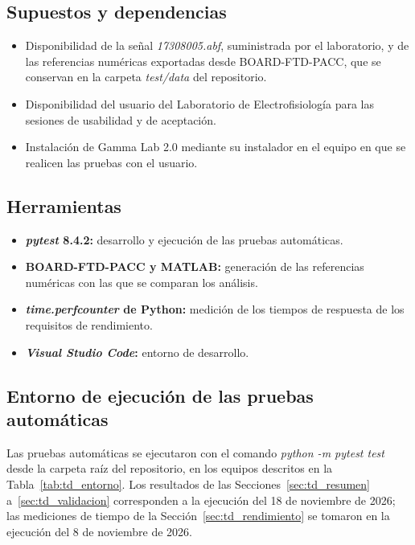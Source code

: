 \documentclass[12pt,letterpaper,oneside]{article}
\DeclareRobustCommand{\_}{\textunderscore\allowbreak}
\begin{document}
\subsection{Supuestos y dependencias}
\begin{itemize}
    \item Disponibilidad de la señal \textit{17308005.abf}, suministrada por el laboratorio, y de las referencias numéricas exportadas desde BOARD-FTD-PACC, que se conservan en la carpeta \textit{test/data} del repositorio.
    \item Disponibilidad del usuario del Laboratorio de Electrofisiología para las sesiones de usabilidad y de aceptación.
    \item Instalación de Gamma Lab 2.0 mediante su instalador en el equipo en que se realicen las pruebas con el usuario.
\end{itemize}

\subsection{Herramientas}
\begin{itemize}
    \item \textbf{\textit{pytest} 8.4.2:} desarrollo y ejecución de las pruebas automáticas.
    \item \textbf{BOARD-FTD-PACC y MATLAB:} generación de las referencias numéricas con las que se comparan los análisis.
    \item \textbf{\textit{time.perf\_counter} de Python:} medición de los tiempos de respuesta de los requisitos de rendimiento.
    \item \textbf{\textit{Visual Studio Code}:} entorno de desarrollo.
\end{itemize}

\subsection{Entorno de ejecución de las pruebas automáticas}
Las pruebas automáticas se ejecutaron con el comando \textit{python -m pytest test} desde la carpeta raíz del repositorio, en los equipos descritos en la Tabla~\ref{tab:td_entorno}. Los resultados de las Secciones~\ref{sec:td_resumen} a~\ref{sec:td_validacion} corresponden a la ejecución del 18 de noviembre de 2026; las mediciones de tiempo de la Sección~\ref{sec:td_rendimiento} se tomaron en la ejecución del 8 de noviembre de 2026.
\end{document}
